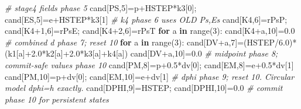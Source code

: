 \documentclass[
  a4paper,
]{ltjsarticle}
\newenvironment{Shaded}{}{}
\newcommand{\BuiltInTok}[1]{\textcolor[rgb]{0.00,0.50,0.00}{#1}}
\newcommand{\CommentTok}[1]{\textcolor[rgb]{0.38,0.63,0.69}{\textit{#1}}}
\newcommand{\ControlFlowTok}[1]{\textcolor[rgb]{0.00,0.44,0.13}{\textbf{#1}}}
\newcommand{\DecValTok}[1]{\textcolor[rgb]{0.25,0.63,0.44}{#1}}
\newcommand{\FloatTok}[1]{\textcolor[rgb]{0.25,0.63,0.44}{#1}}
\newcommand{\KeywordTok}[1]{\textcolor[rgb]{0.00,0.44,0.13}{\textbf{#1}}}
\newcommand{\NormalTok}[1]{#1}
\newcommand{\OperatorTok}[1]{\textcolor[rgb]{0.40,0.40,0.40}{#1}}
\begin{document}
\begin{Shaded}
\begin{Highlighting}[]
    \CommentTok{\# stage4 fields phase 5}
\NormalTok{    cand[PS,}\DecValTok{5}\NormalTok{]}\OperatorTok{=}\NormalTok{p}\OperatorTok{+}\NormalTok{HSTEP}\OperatorTok{*}\NormalTok{k3[}\DecValTok{0}\NormalTok{]}\OperatorTok{;}\NormalTok{ cand[ES,}\DecValTok{5}\NormalTok{]}\OperatorTok{=}\NormalTok{e}\OperatorTok{+}\NormalTok{HSTEP}\OperatorTok{*}\NormalTok{k3[}\DecValTok{1}\NormalTok{]}
    \CommentTok{\# k4 phase 6 uses OLD Ps,Es}
\NormalTok{    cand[K4,}\DecValTok{6}\NormalTok{]}\OperatorTok{=}\NormalTok{rPsP}\OperatorTok{;}\NormalTok{ cand[K4}\OperatorTok{+}\DecValTok{1}\NormalTok{,}\DecValTok{6}\NormalTok{]}\OperatorTok{=}\NormalTok{rPsE}\OperatorTok{;}\NormalTok{ cand[K4}\OperatorTok{+}\DecValTok{2}\NormalTok{,}\DecValTok{6}\NormalTok{]}\OperatorTok{=}\NormalTok{rPsT}
    \ControlFlowTok{for}\NormalTok{ a }\KeywordTok{in} \BuiltInTok{range}\NormalTok{(}\DecValTok{3}\NormalTok{): cand[K4}\OperatorTok{+}\NormalTok{a,}\DecValTok{10}\NormalTok{]}\OperatorTok{=}\FloatTok{0.0}
    \CommentTok{\# combined d phase 7; reset 10}
    \ControlFlowTok{for}\NormalTok{ a }\KeywordTok{in} \BuiltInTok{range}\NormalTok{(}\DecValTok{3}\NormalTok{):}
\NormalTok{        cand[DV}\OperatorTok{+}\NormalTok{a,}\DecValTok{7}\NormalTok{]}\OperatorTok{=}\NormalTok{(HSTEP}\OperatorTok{/}\FloatTok{6.0}\NormalTok{)}\OperatorTok{*}\NormalTok{(k1[a]}\OperatorTok{+}\FloatTok{2.0}\OperatorTok{*}\NormalTok{k2[a]}\OperatorTok{+}\FloatTok{2.0}\OperatorTok{*}\NormalTok{k3[a]}\OperatorTok{+}\NormalTok{k4[a])}
\NormalTok{        cand[DV}\OperatorTok{+}\NormalTok{a,}\DecValTok{10}\NormalTok{]}\OperatorTok{=}\FloatTok{0.0}
    \CommentTok{\# midpoint phase 8; commit{-}safe values phase 10}
\NormalTok{    cand[PM,}\DecValTok{8}\NormalTok{]}\OperatorTok{=}\NormalTok{p}\OperatorTok{+}\FloatTok{0.5}\OperatorTok{*}\NormalTok{dv[}\DecValTok{0}\NormalTok{]}\OperatorTok{;}\NormalTok{ cand[EM,}\DecValTok{8}\NormalTok{]}\OperatorTok{=}\NormalTok{e}\OperatorTok{+}\FloatTok{0.5}\OperatorTok{*}\NormalTok{dv[}\DecValTok{1}\NormalTok{]}
\NormalTok{    cand[PM,}\DecValTok{10}\NormalTok{]}\OperatorTok{=}\NormalTok{p}\OperatorTok{+}\NormalTok{dv[}\DecValTok{0}\NormalTok{]}\OperatorTok{;}\NormalTok{ cand[EM,}\DecValTok{10}\NormalTok{]}\OperatorTok{=}\NormalTok{e}\OperatorTok{+}\NormalTok{dv[}\DecValTok{1}\NormalTok{]}
    \CommentTok{\# dphi phase 9; reset 10. Circular model dphi=h exactly.}
\NormalTok{    cand[DPHI,}\DecValTok{9}\NormalTok{]}\OperatorTok{=}\NormalTok{HSTEP}\OperatorTok{;}\NormalTok{ cand[DPHI,}\DecValTok{10}\NormalTok{]}\OperatorTok{=}\FloatTok{0.0}
    \CommentTok{\# commit phase 10 for persistent states}

\end{Highlighting}
\end{Shaded}
\end{document}
